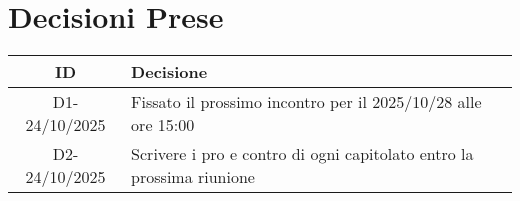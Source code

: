 \documentclass[a4paper,12pt]{article}
\begin{document}
\section{Decisioni Prese}{
    \begin{center}
    \begin{tabular}{|c|p{11cm}|}
        \hline
        \textbf{ID} & \textbf{Decisione} \\
        \hline
            D1-24/10/2025 & Fissato il prossimo incontro per il 2025/10/28 alle ore 15:00 \\
        \hline
	D2-24/10/2025 & Scrivere i pro e contro di ogni capitolato entro la prossima riunione \\
        \hline
    \end{tabular}
    \end{center}
}
\end{document}
